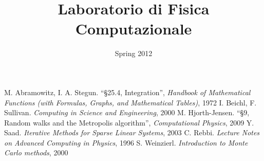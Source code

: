 \documentclass[a4paper,11pt]{report}
\title{\bfseries{\Huge{Laboratorio di Fisica Computazionale}}}
\author{\cursiveshape {Luca Cassia - [MAT. 728341]}}
\date{Spring 2012}
\begin{document}
\maketitle
\tableofcontents






\begin{thebibliography}{9}
 M. Abramowitz, I. A. Stegun. ``§25.4, Integration'', \textit{Handbook of Mathematical Functions (with Formulas, Graphs, and Mathematical Tables)}, 1972
 I. Beichl, F. Sullivan. \textit{Computing in Science and Engineering}, 2000
 M. Hjorth-Jensen. ``§9, Random walks and the Metropolis algorithm'', \textit{Computational Physics}, 2009
 Y. Saad. \textit{Iterative Methods for Sparse Linear Systems}, 2003
 C. Rebbi. \textit{Lecture Notes on Advanced Computing in Physics}, 1996
 S. Weinzierl. \textit{Introduction to Monte Carlo methods}, 2000
\end{thebibliography} 
\end{document}

